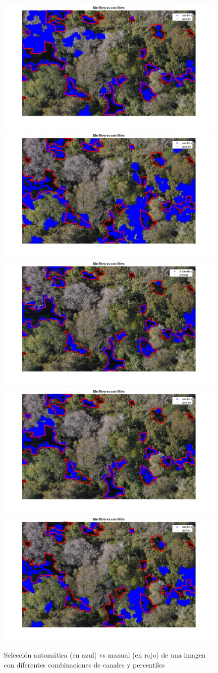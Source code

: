 \begin{figure}
    \includegraphics[width=.3\textwidth]{Imagenes/IIC/p85/BG/320a.jpg}\hfill
    \includegraphics[width=.3\textwidth]{Imagenes/IIC/p85/GR/320a.jpg}\hfill
    \\[\smallskipamount]
    \includegraphics[width=.3\textwidth]{Imagenes/IIC/p90/BR/320a.jpg}\hfill
    \includegraphics[width=.3\textwidth]{Imagenes/IIC/p90/BG/320a.jpg}\hfill
    \includegraphics[width=.3\textwidth]{Imagenes/IIC/p90/GR/320a.jpg}\hfill
    
    \caption{Selección automática (en azul) vs manual (en rojo) de una imagen con diferentes combinaciones de canales y percentiles}
\end{figure}\label{dji320}

